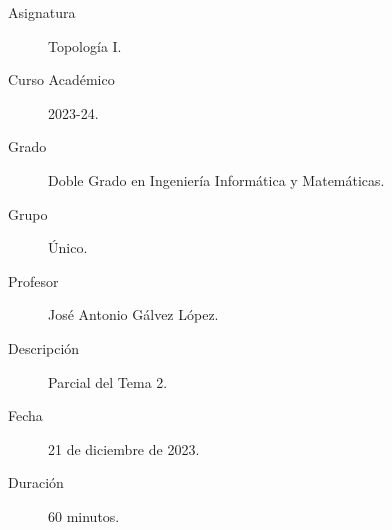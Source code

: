 \documentclass[12pt]{article}
\begin{document}

    
    

    \begin{description}
        \item[Asignatura] Topología I.
        \item[Curso Académico] 2023-24.
        \item[Grado] Doble Grado en Ingeniería Informática y Matemáticas.
        \item[Grupo] Único.
        \item[Profesor] José Antonio Gálvez López.
        \item[Descripción] Parcial del Tema 2.
        \item[Fecha] 21 de diciembre de 2023.
        \item[Duración] 60 minutos.
    
    \end{description}
    \newpage
    
\end{document}
